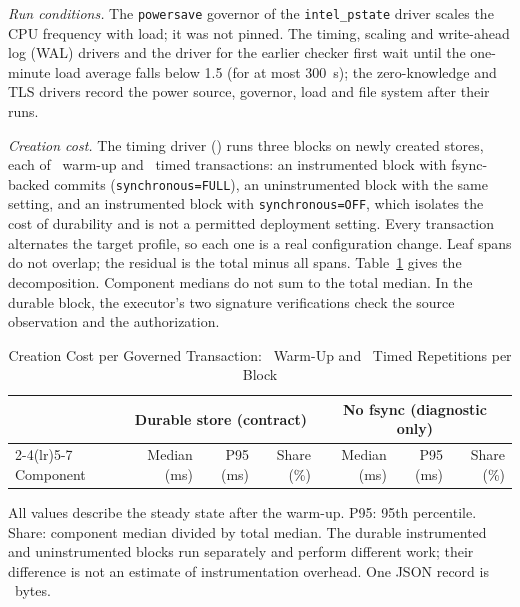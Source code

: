 \documentclass[journal]{IEEEtran}
\newcommand{\code}[1]{\texttt{\footnotesize #1}}
\begin{document}
\emph{Run conditions.} The \texttt{powersave} governor of the \texttt{intel\_pstate} driver scales the CPU frequency with load; it was not pinned. The timing, scaling and write-ahead log (WAL) drivers and the driver for the earlier checker first wait until the one-minute load average falls below 1.5 (for at most 300~s); the zero-knowledge and TLS drivers record the power source, governor, load and file system after their runs.

\emph{Creation cost.} The timing driver () runs three blocks on newly created stores, each of \TimWarmup\ warm-up and \TimTimed\ timed transactions: an instrumented block with fsync-backed commits (\code{synchronous=FULL}), an uninstrumented block with the same setting, and an instrumented block with \code{synchronous=OFF}, which isolates the cost of durability and is not a permitted deployment setting. Every transaction alternates the target profile, so each one is a real configuration change. Leaf spans do not overlap; the residual is the total minus all spans. Table~\ref{tab:timing} gives the decomposition. Component medians do not sum to the total median. In the durable block, the executor's two signature verifications check the source observation and the authorization.

\begin{table}[!t]
\caption{Creation Cost per Governed Transaction: \TimWarmup\ Warm-Up and \TimTimed\ Timed Repetitions per Block}
\label{tab:timing}
\centering
\begin{tabular}{lrrrrrr}
\toprule
 & \multicolumn{3}{c}{Durable store (contract)} & \multicolumn{3}{c}{No fsync (diagnostic only)} \\
\cmidrule(lr){2-4}\cmidrule(lr){5-7}
Component & Median (ms) & P95 (ms) & Share (\%) & Median (ms) & P95 (ms) & Share (\%) \\
\midrule

\end{tabular}
\par\smallskip\parbox{\linewidth}{\footnotesize All values describe the steady state after the warm-up. P95: 95th percentile. Share: component median divided by total median. The durable instrumented and uninstrumented blocks run separately and perform different work; their difference is not an estimate of instrumentation overhead. One JSON record is \RecordBytes\ bytes.}
\end{table}
\end{document}

